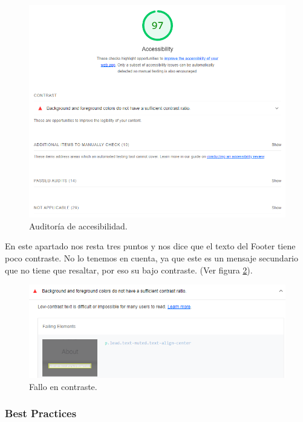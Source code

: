 \documentclass[12pt,twoside,titlepage]{report}
\begin{document}
\begin{figure}[H]
    \centering
    \includegraphics[scale=0.6]{Lighthouse/Accesibility}
    \caption{Auditoría de accesibilidad.}
    \label{fig:Lighthouse_accesibility}
\end{figure}

En este apartado nos resta tres puntos y nos dice que el texto del Footer tiene poco contraste. No lo tenemos en cuenta, ya que este es un mensaje secundario que no tiene que resaltar, por eso su bajo contraste. (Ver figura \ref{fig:Lighthouse_contrast}).

\begin{figure}[H]
    \centering
    \includegraphics[scale=0.6]{Lighthouse/AccesibilityContrast}
    \caption{Fallo en contraste.}
    \label{fig:Lighthouse_contrast}
\end{figure}

\subsubsection{Best Practices}
\end{document}
